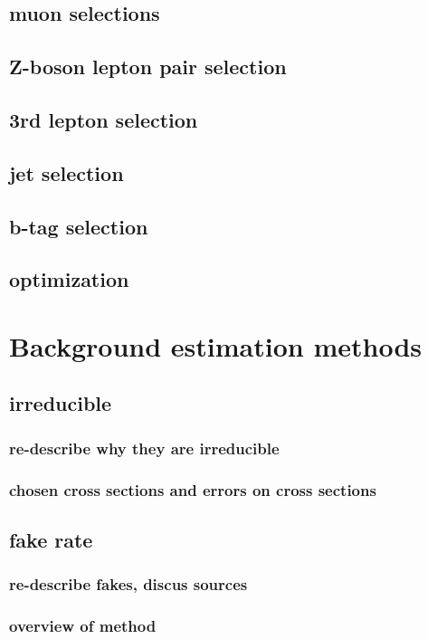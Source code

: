 \documentclass[12pt,chapterheads,oneside]{ucsd}
\begin{document}
	\section{muon selections}
	\section{Z-boson lepton pair selection}
	\section{3rd lepton selection}
	\section{jet selection}
	\section{b-tag selection}
	\section{optimization}

\chapter{Background estimation methods}
	\section{irreducible}
        		\subsection{re-describe why they are irreducible}
        		\subsection{chosen cross sections and errors on cross sections}
	\section{fake rate}
        		\subsection{re-describe fakes, discus sources}
       		\subsection{overview of method}
\end{document}
